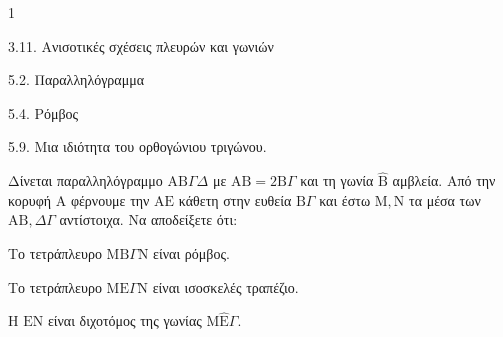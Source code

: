 \begin{ylh}{1}
    \item 3.11. Ανισοτικές σχέσεις πλευρών και γωνιών
    \item 5.2. Παραλληλόγραμμα
    \item 5.4. Ρόμβος
    \item 5.9. Μια ιδιότητα του ορθογώνιου τριγώνου.
\end{ylh}
Δίνεται παραλληλόγραμμο $\mathrm{A}\mathrm{B}\Gamma\Delta$ με $\mathrm{A}\mathrm{B} = 2\mathrm{B}\Gamma$ και τη γωνία $\hat{\mathrm{B}}$ αμβλεία. Από την κορυφή $\mathrm{A}$ φέρνουμε την $\mathrm{A}\mathrm{E}$ κάθετη στην ευθεία $\mathrm{B}\Gamma$ και έστω $\mathrm{M}, \mathrm{N}$ τα μέσα των $\mathrm{A}\mathrm{B}, \Delta\Gamma$ αντίστοιχα.
Να αποδείξετε ότι:
\begin{alist}
    \item Το τετράπλευρο $\mathrm{M}\mathrm{B}\Gamma\mathrm{N}$ είναι ρόμβος. 
    \item Το τετράπλευρο $\mathrm{M}\mathrm{E}\Gamma\mathrm{N}$ είναι ισοσκελές τραπέζιο. 
    \item Η $\mathrm{E}\mathrm{N}$ είναι διχοτόμος της γωνίας $\mathrm{M}\hat{\mathrm{E}}\Gamma$. 
\end{alist}
